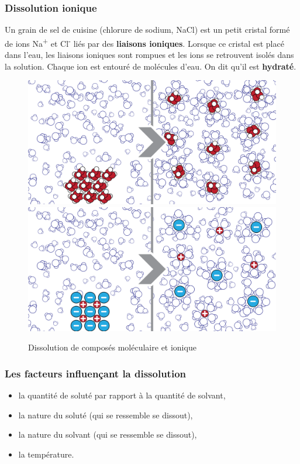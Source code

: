 \documentclass[
  11pt,
  a4paper,
  openany]{book}
\providecommand{\tightlist}{%
  \setlength{\itemsep}{0pt}\setlength{\parskip}{0pt}}
\begin{document}
\subsubsection{Dissolution ionique}\label{dissolution-ionique}

Un grain de sel de cuisine (chlorure de sodium, NaCl) est un petit cristal formé de ions Na\textsuperscript{+} et Cl\textsuperscript{-} liés par des \textbf{liaisons ioniques}.
Lorsque ce cristal est placé dans l'eau, les liaisons ioniques sont rompues et les ions se retrouvent isolés dans la solution. Chaque ion est entouré de molécules d'eau. On dit qu'il est \textbf{hydraté}.

\begin{figure}

{\centering \includegraphics[width=0.45\linewidth]{images/dissolution-1} \includegraphics[width=0.45\linewidth]{images/dissolution-2} 

}

\caption{Dissolution de composés moléculaire et ionique}\label{fig:ionique-moleculaire}
\end{figure}

\subsubsection{Les facteurs influençant la dissolution}\label{les-facteurs-influenuxe7ant-la-dissolution}

\begin{itemize}
\tightlist
\item
  la quantité de soluté par rapport à la quantité de solvant,
\item
  la nature du soluté (qui se ressemble se dissout),
\item
  la nature du solvant (qui se ressemble se dissout),
\item
  la température.
\end{itemize}
\end{document}
